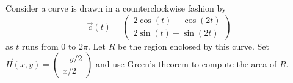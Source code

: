 \documentclass{ximera}
\author{Bart Snapp}
\begin{document}
\begin{exercise}
  Consider a curve is drawn in a counterclockwise fashion by
  \[
  \vec{c}(t) = \begin{pmatrix}
    2\cos(t)-\cos(2t)\\ 2\sin(t)-\sin(2t)
  \end{pmatrix}
  \]
  as $t$ runs from $0$ to $2\pi$. Let $R$ be the region enclosed by
  this curve. Set $\vec{H}(x,y) = \begin{pmatrix}-y/2\\ x/2\end{pmatrix}$ and use Green's
  theorem to compute the area of $R$.
\end{exercise}
\end{document}

